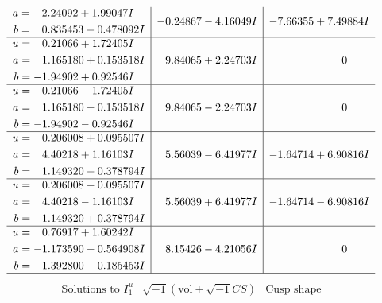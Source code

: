 \documentclass[1p]{elsarticle_modified}
\theoremstyle{definition}
\newcommand{\I}{\sqrt{-1}}
\begin{document}
$$\begin{array}{c|c|c}
\begin{aligned}
a &= \phantom{-}2.24092 + 1.99047 I \\
b &= \phantom{-}0.835453 - 0.478092 I\end{aligned}
 & -0.24867 - 4.16049 I & -7.66355 + 7.49884 I \\ \hline\begin{aligned}
u &= \phantom{-}0.21066 + 1.72405 I \\
a &= \phantom{-}1.165180 + 0.153518 I \\
b &= -1.94902 + 0.92546 I\end{aligned}
 & \phantom{-}9.84065 + 2.24703 I & \phantom{-0.000000 } 0 \\ \hline\begin{aligned}
u &= \phantom{-}0.21066 - 1.72405 I \\
a &= \phantom{-}1.165180 - 0.153518 I \\
b &= -1.94902 - 0.92546 I\end{aligned}
 & \phantom{-}9.84065 - 2.24703 I & \phantom{-0.000000 } 0 \\ \hline\begin{aligned}
u &= \phantom{-}0.206008 + 0.095507 I \\
a &= \phantom{-}4.40218 + 1.16103 I \\
b &= \phantom{-}1.149320 - 0.378794 I\end{aligned}
 & \phantom{-}5.56039 - 6.41977 I & -1.64714 + 6.90816 I \\ \hline\begin{aligned}
u &= \phantom{-}0.206008 - 0.095507 I \\
a &= \phantom{-}4.40218 - 1.16103 I \\
b &= \phantom{-}1.149320 + 0.378794 I\end{aligned}
 & \phantom{-}5.56039 + 6.41977 I & -1.64714 - 6.90816 I \\ \hline\begin{aligned}
u &= \phantom{-}0.76917 + 1.60242 I \\
a &= -1.173590 - 0.564908 I \\
b &= \phantom{-}1.392800 - 0.185453 I\end{aligned}
 & \phantom{-}8.15426 - 4.21056 I & \phantom{-0.000000 } 0\\
 \hline 
 \end{array}$$\newpage$$\begin{array}{c|c|c}  
\text{Solutions to }I^u_{1}& \I (\text{vol} + \sqrt{-1}CS) & \text{Cusp shape}\\
 \hline 
\begin{aligned}

\end{aligned}
\end{array}$$
\end{document}
